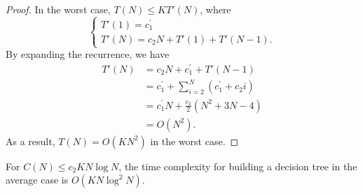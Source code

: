 \begin{proof}
In the worst case, $T(N) \leq  K T'(N)$, where
\begin{equation}
\begin{cases}
T'(1) = c_1^\prime \\
T'(N) = c_2 N +  T'(1) + T'(N-1).
\end{cases}
\end{equation}
By expanding the recurrence, we have
\begin{align}
T'(N) &= c_2 N + c_1^\prime + T'(N-1) \nonumber \\
      &= c_1^\prime + \sum_{i=2}^N (c_1^\prime + c_2 i) \nonumber \\
      &= c_1^\prime N + \frac{c_2}{2} (N^2 + 3N - 4) \nonumber \\
      &= O(N^2).
\end{align}
As a result, $T(N) = O(K N^2)$ in the worst case.
\end{proof}

\begin{theorem}\label{thm:6:average:knlogn}
For $C(N)\leq c_2 K N\log N$, the time complexity for building a decision
tree in the average case is $O(K N \log^2 N)$.
\end{theorem}

